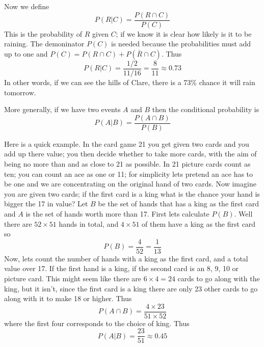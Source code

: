 \documentclass[11pt,a4paper]{scrartcl}
\begin{document}
Now we define
\begin{equation}
P(R|C)=\frac{P(R\cap C)}{P(C)} 
\end{equation}
This is the probability of $R$ given $C$; if we know it is clear how
likely is it to be raining. The demoninator $P(C)$ is needed because
the probabilities must add up to one and $P(C)=P(R\cap C)+P(\bar{R}\cap C)$. Thus
\begin{equation}
P(R|C)=\frac{1/2}{11/16}=\frac{8}{11}\approx  0.73
\end{equation}
In other words, if we can see the hills of Clare, there is a 73\%
chance it will rain tomorrow.

More generally, if we have two events $A$ and $B$ then the conditional probability is
\begin{equation}
P(A|B)=\frac{P(A\cap B)}{P(B)}
\end{equation}

Here is a quick example. In the card game 21 you get given two cards
and you add up there value; you then decide whether to take more
cards, with the aim of being no more than and as close to 21 as
possible. In 21 picture cards count as ten; you can count an ace as
one or 11; for simplicity lets pretend an ace has to be one and we are
concentrating on the original hand of two cards. Now imagine you are
given two cards; if the first card is a king what is the chance your
hand is bigger the 17 in value? Let $B$ be the set of hands that has a
king as the first card and $A$ is the set of hands worth more than
17. First lets calculate $P(B)$. Well there are $52\times 51$ hands in
total, and $4\times 51$ of them have a king as the first card so
\begin{equation}
P(B)=\frac{4}{52}=\frac{1}{13}
\end{equation}
Now, lets count the number of hands with a king as the first card, and
a total value over 17. If the first hand is a king, if the second card
is an 8, 9, 10 or picture card. This might seem like there are
$6\times 4=24$ cards to go along with the king, but it isn't, since
the first card is a king there are only 23 other cards to go along
with it to make 18 or higher. Thus
\begin{equation}
P(A\cap B)=\frac{4\times 23}{51\times 52}
\end{equation}
where the first four corresponds to the choice of king. Thus
\begin{equation}
P(A|B)=\frac{23}{51}\approx 0.45
\end{equation}
\end{document}
